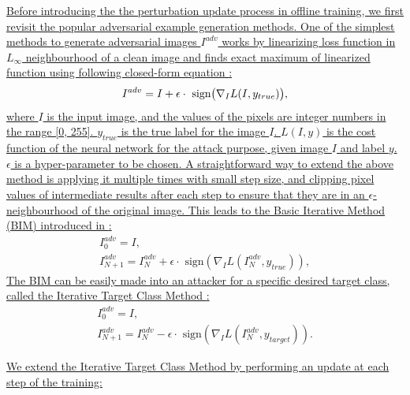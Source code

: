 \documentclass[12pt]{article}
\begin{document}
\uline{Before introducing the the perturbation update process in offline training, we first revisit the popular adversarial example generation methods. One of the simplest methods to generate adversarial images $I^{adv}$ works by linearizing loss function in $L_{\infty}$ neighbourhood of a clean image and finds exact maximum of linearized function using following closed-form equation \cite{FGSM}:}
\begin{equation}
    I^{adv} = I + \epsilon \cdot \text{ sign} \bigl( \nabla_I L(I, y_{true})  \bigr),
    \vspace{-0.1cm}
\end{equation}
\uline{where $I$ is the input image, and the values of the pixels are integer numbers in the range [0, 255]. $y_{true}$ is the true label for the image $I$. $L(I, y)$ is the cost function of the neural network for the attack purpose, given image $I$ and label $y$. $\epsilon$ is a hyper-parameter to be chosen. A straightforward way to extend the above method is applying it multiple times with small step size, and clipping pixel values of intermediate results after each step to ensure that they are in an $\epsilon$-neighbourhood of the original image.  This leads to the Basic Iterative Method (BIM) introduced in \cite{kurakin2017adversarial}:}
\begin{equation}
    \begin{gathered}
        I_0^{adv} = I, \\
        I_{N+1}^{adv} = I_N^{adv}+\epsilon \cdot \text{ sign}(\nabla_I L(I_N^{adv},y_{true})),
    \end{gathered}
\end{equation}
\uline{The BIM can be easily made into an attacker for a specific desired target class, called the Iterative Target Class Method \cite{kurakin2017adversarial}:}
\begin{equation}
  \begin{gathered}
      I_0^{adv} = I,\\
      I_{N+1}^{adv} = I_N^{adv}-\epsilon \cdot \text{ sign}(\nabla_I L(I_N^{adv},y_{target})).
  \end{gathered}
  \label{equ:itcm}
\end{equation}

\uline{We extend the Iterative Target Class Method by performing an update at each step of the training:}
\end{document}
